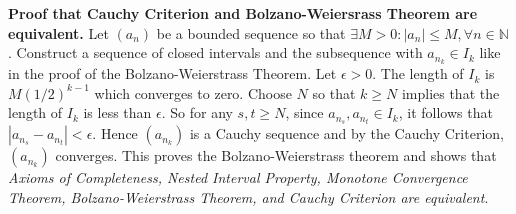 \documentclass{article}
\begin{document}
            \textbf{Proof that Cauchy Criterion and Bolzano-Weiersrass Theorem are equivalent.} Let $(a_n)$ be a bounded sequence so that $\exists M > 0 : |a_n| \leq M, \forall n \in \mathbb{N}$. Construct a sequence of closed intervals and the subsequence with $a_{n_k} \in I_k$ like in the proof of the Bolzano-Weierstrass Theorem. Let $\epsilon > 0$. The length of $I_k$ is $M(1/2)^{k-1}$ which converges to zero. Choose $N$ so that $k \geq N$ implies that the length of $I_k$ is less than $\epsilon$. So for any $s,t \geq N$, since $a_{n_s},a_{n_t} \in I_k$, it follows that $|a_{n_s} - a_{n_t}| < \epsilon$. Hence $(a_{n_k})$ is a Cauchy sequence and by the Cauchy Criterion, $(a_{n_k})$ converges. This proves the Bolzano-Weierstrass theorem and shows that \textit{Axioms of Completeness, Nested Interval Property, Monotone Convergence Theorem, Bolzano-Weierstrass Theorem, and Cauchy Criterion are equivalent}.
              
\end{document}
